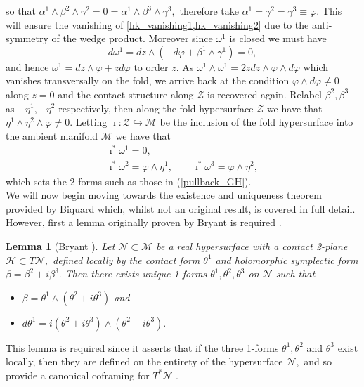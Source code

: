 \documentclass[a4paper,12pt, onecolumn, notitlepage]{article}
\newtheorem{lem}[thm]{Lemma}
\theoremstyle{definition}
\theoremstyle{remark}
\newcommand{\al}{\alpha}
\newcommand{\w}{\omega}
\newcommand{\vp}{\varphi}
\begin{document}
so that $\al^{1}\wedge\beta^{2}\wedge\gamma^{2} = 0 = \al^{1}\wedge\beta^{3}\wedge\gamma^{3},$ therefore take $\al^{1}=\gamma^{2}=\gamma^{3}\equiv\varphi.$ This will ensure the vanishing of \cref{hk_vanishing1,hk_vanishing2} due to the anti-symmetry of the wedge product. Moreover since $\w^{1}$ is closed we must have 
\begin{equation*}
	d\w^{1}	= dz\wedge (-d\varphi + \beta^{1}\wedge\gamma^{1})
	= 0,
\end{equation*}
and hence $\w^{1} = dz\wedge\varphi + zd\varphi$ to order $z.$ As $\w^{1}\wedge\w^{1} = 2zdz\wedge\varphi\wedge d\varphi$ which vanishes transversally on the fold, we arrive back at the condition $\varphi\wedge d\varphi\neq 0$ along $z=0$ and the contact structure along $\mathcal{Z}$ is recovered again. Relabel $\beta^{2},\beta^{3}$ as $-\eta^{1}, -\eta^{2}$ respectively, then along the fold hypersurface $\mathcal{Z}$ we have that $\eta^{1}\wedge\eta^{2}\wedge\vp\neq 0.$ Letting $\imath:\mathcal{Z}\hookrightarrow\mathcal{M}$ be the inclusion of the fold hypersurface into the ambient manifold $\mathcal{M}$ we have that
\begin{gather}
	\imath^{\ast}\w^{1} = 0,\nonumber\\
	\label{k_pullbacks}
	\imath^{\ast}\w^{2} = \vp\wedge\eta^{1},\qquad \imath^{\ast}\w^{3} = \vp\wedge\eta^{2},
\end{gather}
which sets the 2-forms such as those in (\ref{pullback_GH}).\\
We will now begin moving towards the existence and uniqueness theorem provided by Biquard which, whilst not an original result, is covered in full detail. However, first a lemma originally proven by Bryant is required \cite{bryant_2004}.\\

\begin{lem}[Bryant \cite{bryant_2004}]
	\label{bryant}
	Let $\mathcal{N}\subset\mathcal{M}$ be a real hypersurface with a contact 2-plane $\mathcal{H}\subset T\mathcal{N},$ defined locally by the contact form $\theta^{1}$ and holomorphic symplectic form $\beta = \beta^{2} + i\beta^{3}.$ Then there exists unique 1-forms $\theta^{1},\theta^{2},\theta^{3}$ on $\mathcal{N}$ such that
	\begin{itemize}
		\item $\beta = \theta^{1}\wedge(\theta^{2}+i\theta^{3})$ and
		\item $d\theta^{1}=i(\theta^{2}+i\theta^{3})\wedge (\theta^{2}-i\theta^{3}).$\\
	\end{itemize}
\end{lem}
This lemma is required since it asserts that if the three 1-forms $\theta^{1},\theta^{2}$ and $\theta^{3}$ exist locally, then they are defined on the entirety of the hypersurface $\mathcal{N},$ and so provide a canonical coframing for $T^{\ast}\mathcal{N}$ \cite{bryant_2004}.\\
\end{document}
